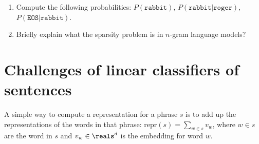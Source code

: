 \begin{enumerate}
    \item Compute the following probabilities: $P(\texttt{rabbit})$, $P(\texttt{rabbit}|\texttt{roger})$, $P(\texttt{EOS}|\texttt{rabbit})$.\\

    \item Briefly  explain what the sparsity problem is in $n$-gram language models? \\
\end{enumerate}



\clearpage

\section{Challenges of linear classifiers of sentences}
A simple way to compute a representation for a phrase $s$ is to add up the representations of the words in that phrase: $\text{repr}(s) = \sum_{w \in s} v_w$, 
where $w \in s$ are the word in  $s$ and $v_w \in \reals^d$ is the embedding for word $w$. 

